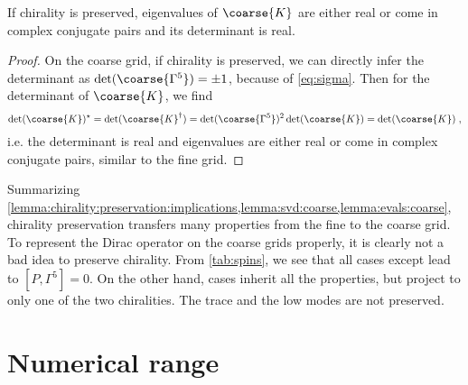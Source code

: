 \begin{lemma} \label{lemma:evals:coarse}
If chirality is preserved, eigenvalues of $\coarse{K}$ are either real or come in complex conjugate pairs and its determinant is real.
\end{lemma}

\begin{proof}
On the coarse grid, if chirality is preserved, we can directly infer the determinant as $\det(\coarse{\Gamma^{5}}) = \pm 1$, because of \cref{eq:sigma}.
Then for the determinant of $\coarse{K}$, we find
\begin{equation}
\det(\coarse{K})^{\star} =
\det(\coarse{K}^{\dagger}) =
\det(\coarse{\Gamma^{5}})^{2} \det(\coarse{K}) =
\det(\coarse{K}) \;,
\end{equation}
i.e. the determinant is real and eigenvalues are either real or come in complex conjugate pairs, similar to the fine grid.
\end{proof}


Summarizing \cref{lemma:chirality:preservation:implications,lemma:svd:coarse,lemma:evals:coarse}, chirality preservation transfers many properties from the fine to the coarse grid.
To represent the Dirac operator on the coarse grids properly, it is clearly not a bad idea to preserve chirality.
From \cref{tab:spins}, we see that all cases except  lead to $[P, \Gamma^{5}]=0$.
On the other hand, cases  inherit all the properties, but project to only one of the two chiralities.
The trace and the low modes are not preserved.


\section{Numerical range}

